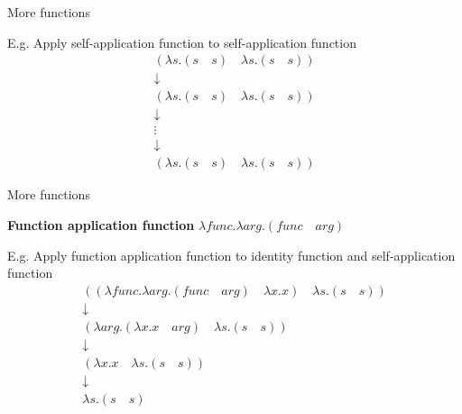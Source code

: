 \documentclass{beamer}
\begin{document}
\begin{frame}{More functions}
	\begin{block}{E.g. Apply self-application function to self-application function}
    	\begin{gather*}
        	(\lambda s . (s \quad s) \quad \lambda s . (s \quad s)) \\
            \downarrow \\
            (\lambda s . (s \quad s) \quad \lambda s . (s \quad s)) \\
            \downarrow \\
            \vdots \\
            \downarrow \\
            (\lambda s . (s \quad s) \quad \lambda s . (s \quad s))
        \end{gather*}
    \end{block}
\end{frame}

\begin{frame}{More functions}
	\begin{framed}
    	\textbf{Function application function} \hfill $\lambda func . \lambda arg . (func \quad arg)$
    \end{framed}
    \begin{block}{E.g. Apply function application function to identity function and  self-application function}
    	\begin{gather*}
        	((\lambda func . \lambda arg . (func \quad arg) \quad \lambda x . x) \quad \lambda s . (s \quad s)) \\
            \downarrow \\
			(\lambda arg . (\lambda x . x \quad arg) \quad \lambda s . (s \quad s)) \\
            \downarrow \\
            (\lambda x . x \quad \lambda s . (s \quad s)) \\
            \downarrow \\
            \lambda s . (s \quad s)
        \end{gather*}
    \end{block}
\end{frame}
\end{document}
